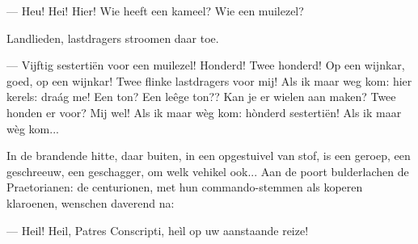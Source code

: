 \documentclass[a4paper, 12pt, oneside, dutch]{article}
\begin{document}
--- Heu! Hei! Hier! Wie heeft een kameel? Wie een muilezel?

Landlieden, lastdragers stroomen daar toe.

--- Vijftig sestertiën voor een muilezel! Honderd! Twee honderd! Op een wijnkar, goed, op een wijnkar! Twee flinke lastdragers voor mij! Als ik maar weg kom: hier kerels: draág me! Een ton? Een leêge ton?? Kan je er wielen aan maken? Twee honden er voor? Mij wel! Als ik maar wèg kom: hònderd sestertiën! Als ik maar wèg kom...

In de brandende hitte, daar buiten, in een opgestuivel van stof, is een geroep, een geschreeuw, een geschagger, om welk vehikel ook... Aan de poort bulderlachen de Praetorianen: de centurionen, met hun commando-stemmen als koperen klaroenen, wenschen daverend na:

--- Heil! Heil, Patres Conscripti, heìl op uw aanstaande reize!

\subsection{}
\end{document}
